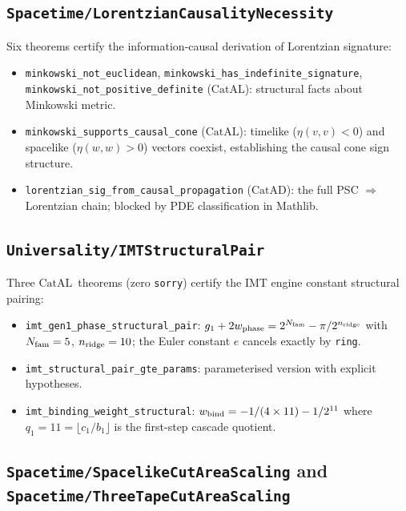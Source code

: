 \documentclass[11pt,a4paper]{article}
\theoremstyle{definition}
\newcommand{\CatAL}{\ensuremath{\mathrm{CatAL}}}
\newcommand{\CatAD}{\ensuremath{\mathrm{CatAD}}}
\begin{document}
\subsection{\texttt{Spacetime/LorentzianCausalityNecessity}}\label{subsec:lorentzian-causality}

Six theorems certify the information-causal derivation of Lorentzian signature:
\begin{itemize}[nosep]
\item \lstinline|minkowski_not_euclidean|, \lstinline|minkowski_has_indefinite_signature|,
  \lstinline|minkowski_not_positive_definite| (\CatAL): structural facts about Minkowski metric.
\item \lstinline|minkowski_supports_causal_cone| (\CatAL): timelike ($\eta(v,v)<0$) and
  spacelike ($\eta(w,w)>0$) vectors coexist, establishing the causal cone sign structure.
\item \lstinline|lorentzian_sig_from_causal_propagation| (\CatAD): the full
  PSC $\Rightarrow$ Lorentzian chain; blocked by PDE classification in Mathlib.
\end{itemize}

\subsection{\texttt{Universality/IMTStructuralPair}}\label{subsec:imt-structural}

Three \CatAL\ theorems (zero \texttt{sorry}) certify the IMT engine constant structural pairing:
\begin{itemize}[nosep]
\item \lstinline|imt_gen1_phase_structural_pair|: $g_1 + 2 w_{\rm phase} = 2^{N_{\rm fam}} - \pi/2^{n_{\rm ridge}}$
  with $N_{\rm fam} = 5$, $n_{\rm ridge} = 10$; the Euler constant $e$ cancels exactly by \lstinline|ring|.
\item \lstinline|imt_structural_pair_gte_params|: parameterised version with explicit hypotheses.
\item \lstinline|imt_binding_weight_structural|: $w_{\rm bind} = -1/(4\times11) - 1/2^{11}$
  where $q_1 = 11 = \lfloor c_1/b_1\rfloor$ is the first-step cascade quotient.
\end{itemize}

\subsection{\texttt{Spacetime/SpacelikeCutAreaScaling} and \texttt{Spacetime/ThreeTapeCutAreaScaling}}\label{subsec:cut-area-scaling}
\end{document}
